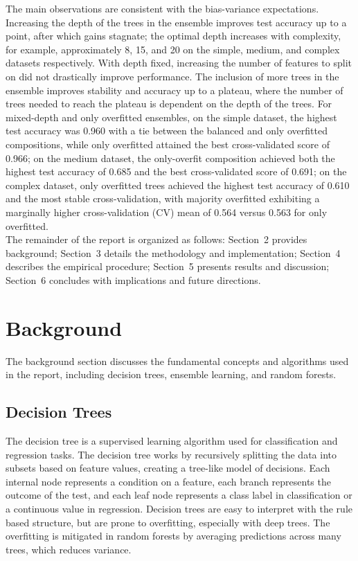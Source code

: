 \documentclass[conference]{IEEEtran}
\begin{document}
The main observations are consistent with the bias-variance expectations. Increasing the depth of the trees in the ensemble improves test accuracy up to a point, after which gains stagnate; the optimal depth increases with complexity, for example, approximately 8, 15, and 20 on the simple, medium, and complex datasets respectively. With depth fixed, increasing the number of features to split on did not drastically improve performance. The inclusion of more trees in the ensemble improves stability and accuracy up to a plateau, where the number of trees needed to reach the plateau is dependent on the depth of the trees. For mixed-depth and only overfitted ensembles, on the simple dataset, the highest test accuracy was 0.960 with a tie between the balanced and only overfitted compositions, while only overfitted attained the best cross-validated score of 0.966; on the medium dataset, the only-overfit composition achieved both the highest test accuracy of 0.685 and the best cross-validated score of 0.691; on the complex dataset, only overfitted trees achieved the highest test accuracy of 0.610 and the most stable cross-validation, with majority overfitted exhibiting a marginally higher cross-validation (CV) mean of 0.564 versus 0.563 for only overfitted.\\

The remainder of the report is organized as follows: Section~2 provides background; Section~3 details the methodology and implementation; Section~4 describes the empirical procedure; Section~5 presents results and discussion; Section~6 concludes with implications and future directions.

\section{Background}
The background section discusses the fundamental concepts and algorithms used in the report, including decision trees, ensemble learning, and 
random forests.

\subsection{Decision Trees}
The decision tree is a supervised learning algorithm used for classification and regression tasks. The decision tree works by recursively 
splitting the data into subsets based on feature values, creating a tree-like model of decisions. Each internal node represents a condition on a 
feature, each branch represents the outcome of the test, and each leaf node represents a class label in classification or a continuous value 
in regression. Decision trees are easy to interpret with the rule based structure, but are prone to overfitting, especially with deep trees. The overfitting is 
mitigated in random forests by averaging predictions across many trees, which reduces variance.
\end{document}
